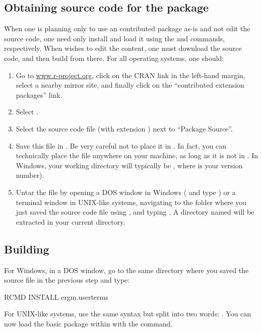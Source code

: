 \documentclass[nojss]{jss}
\begin{document}
\subsection[Obtaining source code for the ergm.userterms package]{Obtaining source code for the  package}
\label{Source}

When one is planning only to use an  contributed package as-is and
not edit the source code, one need only install and load it using the  and  commands, respectively.
When wishes to edit the content, one must download the source code,
and then build from there. For all operating systems, one should:

\begin{enumerate}
\item Go to \url{www.r-project.org}, click on the CRAN link in the left-hand margin,
select a nearby mirror site, and finally click on the ``contributed extension packages''
link.
\item Select .
\item Select the source code file (with extension ) next to ``Package Source''.
\item Save this file in .  Be very careful not to place it in . In fact, you can technically place the file anywhere on your machine, as long as it is not in .  In Windows, your  working directory will typically be , where  is your  version number).
\item Untar the file by opening a DOS window in
Windows ( and type ) or a terminal window in
UNIX-like systems,
navigating to the folder where you just saved the source code file
using , and typing .
A directory named  will be extracted in your current directory.
\end{enumerate}

\subsection[Building ergm.userterms]{Building }
\label{BuildEUT}

For Windows, in a DOS window, go to the same directory where you saved the  source file in the previous step and type:
\begin{CodeChunk}
\begin{CodeInput}
RCMD INSTALL ergm.userterms
\end{CodeInput}
\end{CodeChunk}
For UNIX-like systems, use the same syntax but split 
into two words: .
You can now load the basic  package within  with the  command.
\end{document}

